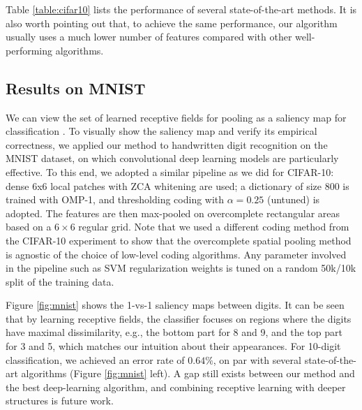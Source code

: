 Table \ref{table:cifar10} lists the performance of several state-of-the-art methods. It is also worth pointing out that, to achieve the same performance, our algorithm usually uses a much lower number of features compared with other well-performing algorithms.

\subsection{Results on MNIST}
We can view the set of learned receptive fields for pooling as a saliency map for classification \cite{Itti:2001wa}. To visually show the saliency map and verify its empirical correctness, we applied our method to handwritten digit recognition on the MNIST dataset, on which convolutional deep learning models are particularly effective. To this end, we adopted a similar pipeline as we did for CIFAR-10: dense 6x6 local patches with ZCA whitening are used; a dictionary of size $800$ is trained with OMP-1, and thresholding coding with $\alpha=0.25$ (untuned) is adopted. The features are then max-pooled on overcomplete rectangular areas based on a $6\times 6$ regular grid. Note that we used a different coding method from the CIFAR-10 experiment to show that the overcomplete spatial pooling method is agnostic of the choice of low-level coding algorithms. Any parameter involved in the pipeline such as SVM regularization weights is tuned on a random 50k/10k split of the training data.

Figure \ref{fig:mnist} shows the 1-vs-1 saliency maps between digits. It can be seen that by learning receptive fields, the classifier focuses on regions where the digits have maximal dissimilarity, e.g., the bottom part for 8 and 9, and the top part for 3 and 5, which matches our intuition about their appearances. For 10-digit classification, we achieved an error rate of $0.64\%$, on par with several state-of-the-art algorithms (Figure \ref{fig:mnist} left). A gap still exists between our method and the best deep-learning algorithm, and combining receptive learning with deeper structures is future work.

